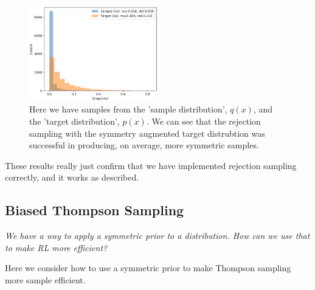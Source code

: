 \begin{figure}[h!]
  \centering
  \includegraphics[width=0.5\textwidth,height=0.25\textheight]{../../pictures/figures/s2-prior-rejection-8d.png}
  \caption{Here we have samples from the 'sample distribution', $q(x)$, and the 'target distribution', $p(x)$.
	We can see that the rejection sampling with the symmetry augmented target distrubtion was successful in producing, on average, more symmetric samples. }
\end{figure}

These results really just confirm that we have implemented
rejection sampling correctly, and it works as described.


%
%

\newpage
\subsection{Biased Thompson Sampling} \label{thompson-sampling}

\begin{displayquote}
\textsl{We have a way to apply a symmetric prior to a distribution.
How can we use that to make RL more efficient?}
\end{displayquote}

Here we consider how to use a symmetric prior to make Thompson sampling more sample efficient\footnotemark.

